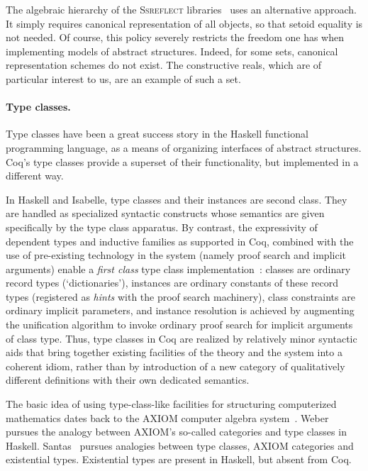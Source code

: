 \documentclass[a4paper,10pt,runningheads]{llncs}
\begin{document}
The algebraic hierarchy of the \textsc{Ssreflect} libraries~\cite{Packed} uses an alternative approach. It simply requires canonical representation of all objects, so that setoid equality is not needed. Of course, this policy severely restricts the freedom one has when implementing models of abstract structures. Indeed, for some sets, canonical representation schemes do not exist. The constructive reals, which are of particular interest to us, are an example of such a set.

\paragraph{Type classes.}

Type classes \cite{wadler1989adhoc} have been a great success story in the Haskell functional programming language, as a means of organizing interfaces of abstract structures. Coq's type classes provide a superset of their functionality, but implemented in a different way.

In Haskell and Isabelle, type classes and their instances are second class. They are handled as specialized syntactic constructs whose semantics are given specifically by the type class apparatus. By contrast, the expressivity of dependent types and inductive families as supported in Coq, combined with the use of pre-existing technology in the system (namely proof search and implicit arguments) enable a \emph{first class} type class implementation~\cite{DBLP:conf/tphol/SozeauO08}: classes are ordinary record types (`dictionaries'), instances are ordinary constants of these record types (registered as \emph{hints} with the proof search machinery), class constraints are ordinary implicit parameters, and instance resolution is achieved by augmenting the unification algorithm to invoke ordinary proof search for implicit arguments of class type.
Thus, type classes in Coq are realized by relatively minor syntactic aids that bring together existing facilities of the theory and the system into a coherent idiom, rather than by introduction of a new category of qualitatively different definitions with their own dedicated semantics.

The basic idea of using type-class-like facilities for structuring computerized mathematics dates back to the \textsc{AXIOM} computer algebra system~\cite{jenks1992axiom}. Weber~\cite{weber1993type} pursues the analogy between \textsc{AXIOM}'s so-called categories and type classes in Haskell. Santas~\cite{santas1995type} pursues analogies between type classes, \textsc{AXIOM} categories and existential types. Existential types are present in Haskell, but absent from Coq.
\end{document}
